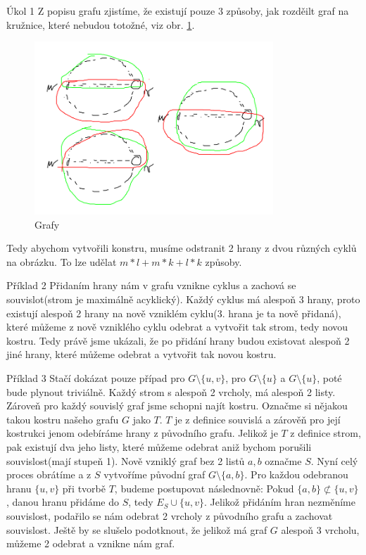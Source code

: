 \documentclass[a4paper]{article}
\begin{document}
    \begin{section}{Úkol 1}
        Z popisu grafu zjistíme, že existují pouze 3 způsoby, jak rozděilt graf na kružnice, které nebudou totožné, viz obr. \ref{fig:grafy-3}.
    \begin{figure}[htpb]
        \centering
        \includegraphics[width=0.8\textwidth]{grafy-3.png}
        \caption{Grafy}
        \label{fig:grafy-3}
    \end{figure}
    Tedy abychom vytvořili konstru, musíme odstranit 2 hrany z dvou různých cyklů na obrázku.
    To lze udělat $m*l + m*k + l*k$ způsoby.
    \end{section}
    \begin{section}{Příklad 2}
        Přidaním hrany nám v grafu vznikne cyklus a zachová se souvislot(strom je maximálně acyklický).
        Každý cyklus má alespoň 3 hrany, proto existují alespoň 2 hrany na nově vzniklém cyklu(3. hrana je ta nově přidaná), které můžeme z nově vzniklého cyklu odebrat a vytvořit tak strom, tedy novou kostru. Tedy právě jsme ukázali, že po přidání hrany budou existovat alespoň 2 jiné hrany, které můžeme odebrat a vytvořit tak novou kostru.
    \end{section}
    \begin{section}{Příklad 3}
        Stačí dokázat pouze případ pro $G \setminus \{u,v\}$, pro $G \setminus \{u\}$ a $G \setminus \{u\}$, poté bude plynout triviálně.
        Každý strom s alespoň 2 vrcholy, má alespoň 2 listy.
        Zároveň pro každý souvislý graf jsme schopni najít kostru.
        Označme si nějakou takou kostru našeho grafu $G$ jako $T$.
        $T$ je z definice souvislá a zárověň pro její kostrukci jenom odebíráme hrany z původního grafu.
        Jelikož je $T$ z definice strom, pak existují dva jeho listy, které můžeme odebrat aniž bychom porušili souvislost(mají stupeň 1). Nově vzniklý graf bez 2 listů $a,b$ označme $S$.
        Nyní celý proces obrátíme a z $S$ vytvoříme původní graf $G \setminus \{a,b\}$.
        Pro každou odebranou hranu $\{u,v\}$ při tvorbě $T$, budeme postupovat následnovně:
        Pokud $\{a,b\} \not \subset\{u,v\}$, danou hranu přidáme do $S$, tedy $E_S \cup \{u,v\}$.
        Jelikož přidáním hran nezměníme souvislost, podařilo se nám odebrat 2 vrcholy z původního grafu a zachovat souvislost. Ještě by se slušelo podotknout, že jelikož má graf $G$ alespoň 3 vrcholu, můžeme 2 odebrat a vznikne nám graf.
    \end{section}
\end{document}
